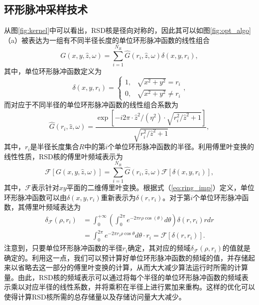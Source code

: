 \documentclass[master]{shtthesis}             %
\begin{document}
\subsection{环形脉冲采样技术}

从图\ref{fig:kernel}中可以看出，RSD核是径向对称的，因此其可以如图\ref{fig:opt_algo}（a）被表达为一组有不同半径长度的单位环形脉冲函数的线性组合
\begin{equation}
    G(x, y, \hat{z}, \omega) = \sum_{i=1}^{N_R}\hat{G}(r_i, \hat{z}, \omega)\delta(x, y, r_i),
\end{equation}
其中，单位环形脉冲函数定义为
\begin{equation}
    \delta(x, y, r_i) = \begin{cases}
      1, & \sqrt{x^2+y^2} = r_i\\
      0, & \sqrt{x^2+y^2} \neq r_i
    \end{cases}\label{eq:ring_imp},
\end{equation}
而对应于不同半径的单位环形脉冲函数的线性组合系数为
\begin{equation} \label{eq:ori_coef}
    \hat{G}(r_i, \hat{z}, \omega) = \frac{\exp{\left[-i2\pi\cdot\hat{z}^2/(\eta^2)\cdot\sqrt{r_i^2/\hat{z}^2+1}\right]}}{\sqrt{r_i^2/\hat{z}^2+1}},
\end{equation}
其中，$r_i$是半径长度集合$R$中的第$i$个单位环形脉冲函数的半径。利用傅里叶变换的线性性质，RSD核的傅里叶频域表示为
\begin{equation}
    \mathcal{F}\left[G(x, y, \hat{z}, \omega)\right] = \sum_{i=1}^{N_{ {R}}}\hat{G}(r_i, \hat{z}, \omega)\mathcal{F}\left[\delta(x, y, r_i)\right],
\end{equation}
其中，$\mathcal{F}$表示针对$xy$平面的二维傅里叶变换。根据式（\ref{eq:ring_imp}）定义，单位环形脉冲函数可以由$\delta(x,y,r_i)$重新表示为$\delta(r,r_i)$。对于第$i$个单位环形脉冲函数，其傅里叶频域表达为
\begin{equation}
    \begin{split}
        \delta_{\mathcal{F}}(\rho, r_i)&=\int_0^{+\infty}\left(\int_0^{2\pi}e^{-2\pi r\rho \cos (\theta)}d\theta\right)\delta(r, r_i)rdr\\
        &=\int^{2\pi}_0e^{-2\pi r_i\rho \cos \theta}d\theta \cdot r_i = \mathcal{F}\left[ \delta(r,r_i) \right].
    \end{split}
\end{equation}
注意到，只要单位环形脉冲函数的半径$r_i$确定，其对应的频域$\delta_{\mathcal{F}}(\rho,r_i)$的值就是确定的。利用这一点，我们可以预计算好单位环形脉冲函数的频域的值，并存储起来以省略去这一部分的傅里叶变换的计算，从而大大减少算法运行时所需的计算量。由此，RSD核的频域表示可以通过将每个半径的单位环形脉冲函数的频域表示乘以对应半径的线性系数，并将乘积在半径上进行累加来重构。这样的优化可以使得计算RSD核所需的总存储量以及存储访问量大大减少。
\end{document}
